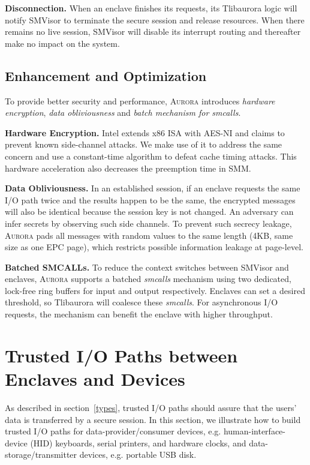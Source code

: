 \textbf{Disconnection.}
When an enclave finishes its requests, its Tlibaurora logic will notify SMVisor to terminate the secure session and release resources. When there remains no live session, SMVisor will disable its interrupt routing and thereafter make no impact on the system.

\subsection{Enhancement and Optimization}\label{enhancement}
To provide better security and performance, \textsc{Aurora} introduces \textit{hardware encryption}, \textit{data obliviousness} and \textit{batch mechanism for smcalls}.

\textbf{Hardware Encryption.}
Intel extends x86 ISA with AES-NI and claims to prevent known side-channel attacks. We make use of it to address the same concern and use a constant-time algorithm to defeat cache timing attacks. This hardware acceleration also decreases the preemption time in SMM.

\textbf{Data Obliviousness.}
In an established session, if an enclave requests the same I/O path twice and the results happen to be the same, the encrypted messages will also be identical because the session key is not changed. An adversary can infer secrets by observing such side channels. To prevent such secrecy leakage, \textsc{Aurora} pads all messages with random values to the same length (4KB, same size as one EPC page), which restricts possible information leakage at page-level. %

\textbf{Batched SMCALLs.}\label{batch}
To reduce the context switches between SMVisor and enclaves, \textsc{Aurora} supports a batched \textit{smcalls} mechanism using two dedicated, lock-free ring buffers for input and output respectively. %
Enclaves can set a desired threshold, so Tlibaurora will coalesce these \textit{smcalls}. For asynchronous I/O requests, the mechanism can benefit the enclave with higher throughput.


\section{Trusted I/O Paths between Enclaves and Devices}\label{tpaths}

As described in section~\autoref{types},  trusted I/O paths  should assure that the users' data is transferred by a secure session. 
In this section, we illustrate how to build trusted I/O paths for data-provider/consumer devices, e.g. human-interface-device (HID) keyboards, serial printers, and hardware clocks, and data-storage/transmitter devices, e.g. portable USB disk.

